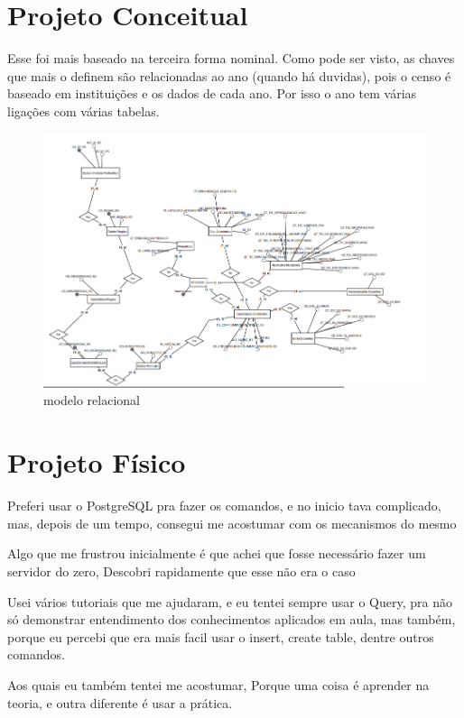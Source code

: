 \documentclass[12pt]{article}
\begin{document}
\section{Projeto Conceitual}

Esse foi mais baseado na terceira forma nominal. Como pode ser visto, as chaves que mais o definem são relacionadas ao ano (quando há duvidas), pois o censo é baseado em instituições e os dados de cada ano. Por isso o ano tem várias ligações com várias tabelas.

\begin{figure}[h!]
\centering
\includegraphics[width=.9\textwidth]{modelo conceitual.PNG}
\caption{modelo relacional}
\end{figure}


\section{Projeto Físico}\label{sec:figs}

Preferi usar o PostgreSQL pra fazer os comandos, e no inicio tava complicado, mas, depois de um tempo, consegui me acostumar com os mecanismos do mesmo 

Algo que me frustrou inicialmente é que achei que fosse necessário fazer um servidor do zero, Descobri rapidamente que esse não era o caso

Usei vários tutoriais que me ajudaram,\cite{videoajuda} e eu tentei sempre usar o Query, pra não só demonstrar entendimento dos conhecimentos aplicados em aula, mas também, porque eu percebi que era mais facil usar o insert, create table, dentre outros comandos.

Aos quais eu também tentei me acostumar, Porque uma coisa é aprender na teoria, e outra diferente é usar a prática.
\end{document}
